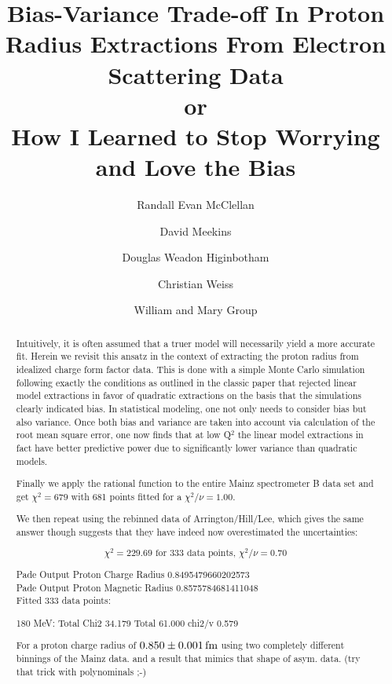 \documentclass[10pt,aps,prc,twocolumn]{revtex4-1}
\begin{document}
\title{Bias-Variance Trade-off In Proton Radius Extractions From Electron Scattering Data \\
or \\
How I Learned to Stop Worrying and Love the Bias}

\author{Randall Evan McClellan}
\author{David Meekins} 
\author{Douglas Weadon Higinbotham}
\author{Christian Weiss}
\author{William and Mary Group}

\begin{abstract}
Intuitively, it is often assumed that a truer model will necessarily yield a more accurate fit.
Herein we revisit this ansatz in the context of extracting the proton radius from idealized
charge form factor data.
This is done with a simple Monte Carlo simulation following exactly the conditions as outlined
in the classic paper that rejected linear model extractions in favor of quadratic extractions
on the basis that the simulations clearly indicated bias. 
In statistical modeling, one not only needs to consider bias but also variance.
Once both bias and variance are taken into account via calculation of the root mean square error, 
one now finds that at low Q$^2$ the linear model extractions in fact have better predictive 
power due to significantly lower variance than quadratic models.

Finally we apply the rational function to the entire Mainz spectrometer B data set and get $\chi^2 = 679$ with 681 points fitted for a $\chi^2/\nu =  1.00$.   

We then repeat using the rebinned data of Arrington/Hill/Lee, which gives the same answer though
suggests that they have indeed now overestimated the uncertainties:

$$ \chi^2 = 229.69 \text{ for } 333 \text{ data points, } \chi^2/\nu = 0.70 $$

Pade Output Proton Charge Radius 0.8495479660202573 \\
Pade Output Proton Magnetic Radius 0.8575784681411048 \\
Fitted 333 data points:

180 MeV: Total Chi2 34.179 Total 61.000 chi2/v 0.579

For a proton charge radius of $\unit[0.850\pm0.001]{fm}$ using two completely different binnings of the Mainz data.
and a result that mimics that shape of asym. data.
(try that trick with polynominals ;-)

\end{abstract}
\end{document}
